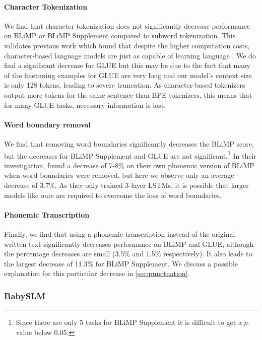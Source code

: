 \paragraph{Character Tokenization} We find that character tokenization does not significantly decrease performance on BLiMP or BLiMP Supplement compared to subword tokenization. This validates previous work which found that despite the higher computation costs, character-based language models are just as capable of learning language \citep{al-rfou_character-level_2019, hahn-baroni-2019-tabula}. We do find a significant decrease for GLUE but this may be due to the fact that many of the finetuning examples for GLUE are very long and our model's context size is only 128 tokens, leading to severe truncation. As character-based tokenizers output more tokens for the same sentence than BPE tokenizers, this means that for many GLUE tasks, necessary information is lost.

\paragraph{Word boundary removal} We find that removing word boundaries significantly decreases the BLiMP score, but the decreases for BLiMP Supplement and GLUE are not significant.\footnote{Since there are only 5 tasks for BLiMP Supplement it is difficult to get a $p$-value below 0.05.} In their investigation, \citet{nguyen-2022-word-boundaries} found a decrease of 7-8\% on their own phonemic version of BLiMP when word boundaries were removed, but here we observe only an average decrease of 3.7\%. As they only trained 3-layer LSTMs, it is possible that larger models like ours are required to overcome the loss of word boundaries.

\paragraph{Phonemic Transcription} Finally, we find that using a phonemic transcription instead of the original written text significantly decreases performance on BLiMP and GLUE, although the percentage decreases are small (3.5\% and 1.5\% respectively). It also leads to the largest decrease of 11.3\% for BLiMP Supplement. We discuss a possible explanation for this particular decrease in \cref{sec:punctuation}.

\subsubsection{BabySLM}
\label{sec:babyslm}

